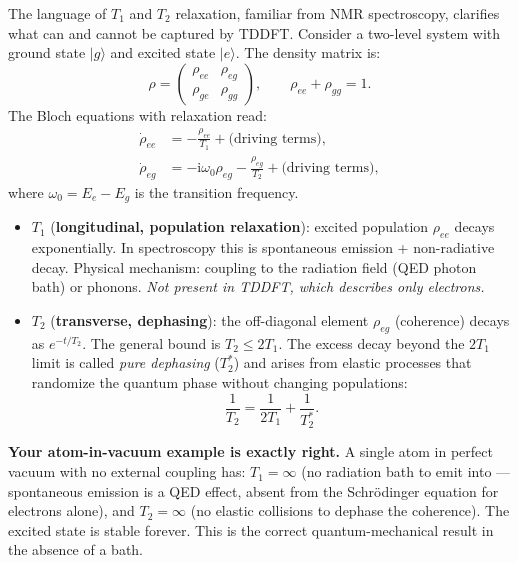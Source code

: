 \documentclass[12pt,letterpaper]{article}
\newcommand{\ii}{\mathrm{i}}
\theoremstyle{definition}
\begin{document}
The language of $T_1$ and $T_2$ relaxation, familiar from NMR
spectroscopy, clarifies what can and cannot be captured by TDDFT.
Consider a two-level system with ground state $|g\rangle$ and excited
state $|e\rangle$.  The density matrix is:
\begin{equation}
  \rho = \begin{pmatrix} \rho_{ee} & \rho_{eg} \\ \rho_{ge} & \rho_{gg} \end{pmatrix},
  \qquad \rho_{ee} + \rho_{gg} = 1.
\end{equation}
The Bloch equations with relaxation read:
\begin{align}
  \dot{\rho}_{ee} &= -\frac{\rho_{ee}}{T_1}
    + \text{(driving terms)}, \label{eq:bloch_pop}\\
  \dot{\rho}_{eg} &= -\ii\omega_0\rho_{eg}
    - \frac{\rho_{eg}}{T_2}
    + \text{(driving terms)}, \label{eq:bloch_coh}
\end{align}
where $\omega_0 = E_e - E_g$ is the transition frequency.

\begin{itemize}
  \item $T_1$ (\textbf{longitudinal, population relaxation}): excited
    population $\rho_{ee}$ decays exponentially.  In spectroscopy this
    is spontaneous emission + non-radiative decay.  Physical mechanism:
    coupling to the radiation field (QED photon bath) or phonons.
    \emph{Not present in TDDFT, which describes only electrons.}

  \item $T_2$ (\textbf{transverse, dephasing}): the off-diagonal element
    $\rho_{eg}$ (coherence) decays as $e^{-t/T_2}$.  The general bound
    is $T_2 \leq 2T_1$.  The excess decay beyond the $2T_1$ limit is
    called \emph{pure dephasing} ($T_2^*$) and arises from
    elastic processes that randomize the quantum phase without
    changing populations:
    \begin{equation}
      \frac{1}{T_2} = \frac{1}{2T_1} + \frac{1}{T_2^*}.
      \label{eq:T2}
    \end{equation}
\end{itemize}

\begin{insight}
\textbf{Your atom-in-vacuum example is exactly right.}
A single atom in perfect vacuum with no external coupling has:
$T_1 = \infty$ (no radiation bath to emit into --- spontaneous emission
is a QED effect, absent from the Schr\"{o}dinger equation for electrons
alone), and $T_2 = \infty$ (no elastic collisions to dephase the
coherence).  The excited state is stable forever.  This is the
correct quantum-mechanical result in the absence of a bath.
\end{insight}
\end{document}

